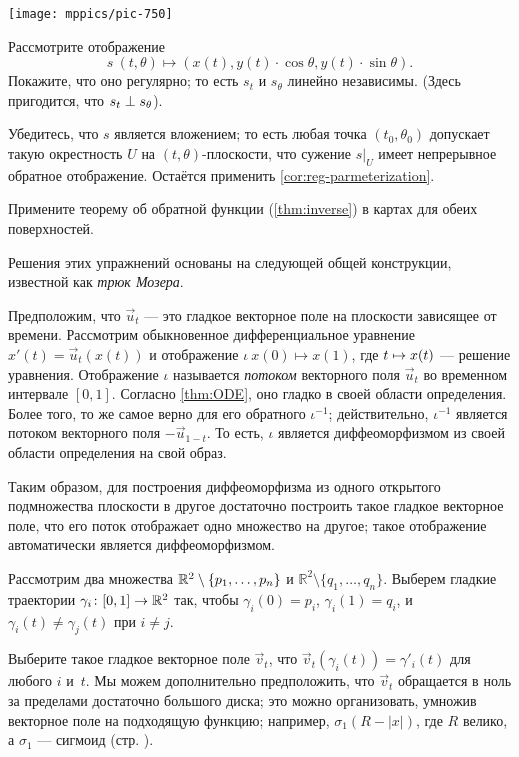 \begin{multicols}{2}
\begin{Figure}
\vskip-0mm
\centering
\texttt{[image: mppics/pic-750]}
\vskip0mm
\end{Figure}

Рассмотрите отображение
\[s\:(t,\theta)\mapsto (x(t), y(t)\cdot\cos\theta,y(t)\cdot\sin\theta).\]
Покажите, что оно регулярно; то есть $s_t$ и $s_\theta$ линейно независимы.
(Здесь пригодится, что $s_t\z\perp s_\theta$).

Убедитесь, что $s$ является вложением;
то есть любая точка $(t_0,\theta_0)$ допускает такую окрестность $U$ на $(t,\theta)$-плоскости, что сужение $s|_U$ имеет непрерывное обратное отображение.
Остаётся применить \ref{cor:reg-parmeterization}.

Примените теорему об обратной функции (\ref{thm:inverse}) в картах для обеих поверхностей.

Решения этих упражнений основаны на следующей общей конструкции, известной как \emph{трюк Мозера}.

Предположим, что $\vec u_t$ --- это гладкое векторное поле на плоскости зависящее от времени.
Рассмотрим обыкновенное дифференциальное уравнение $x'(t)=\vec u_t(x(t))$ и отображение $\iota\:x(0)\mapsto x(1)$, где $t\z\mapsto x(t)$ --- решение уравнения.
Отображение $\iota$ называется \emph{потоком} векторного поля $\vec u_t$ во временном интервале $[0,1]$.
Согласно \ref{thm:ODE}, оно гладко в своей области определения.
Более того, то же самое верно для его обратного $\iota^{-1}$;
действительно, $\iota^{-1}$ является потоком векторного поля $-\vec u_{1-t}$.
То есть, $\iota$ является диффеоморфизмом из своей области определения на свой образ.

Таким образом, для построения диффеоморфизма из одного открытого подмножества плоскости в другое достаточно построить такое гладкое векторное поле, что его поток отображает одно множество на другое;
такое отображение автоматически является диффеоморфизмом.


Рассмотрим два множества $\mathbb{R}^2\z\setminus\{p_1,\dots,p_n\}$ и $\mathbb{R}^2\setminus\{q_1,\dots,q_n\}$.
Выберем гладкие траектории $\gamma_i\:[0,1]\z\to \mathbb{R}^2$ так, чтобы $\gamma_i(0)=p_i$,
$\gamma_i(1)=q_i$, и $\gamma_i(t)\ne \gamma_j(t)$ при $i\ne j$.

Выберите такое гладкое векторное поле $\vec v_t$, что $\vec v_t(\gamma_i(t))=\gamma'_i(t)$ для любого $i$ и~$t$.
Мы можем дополнительно предположить, что $\vec v_t$ обращается в ноль за пределами достаточно большого диска; это можно организовать, умножив векторное поле на подходящую функцию;
например, $\sigma_1(R-|x|)$, где $R$ велико, а $\sigma_1$ --- сигмоид (стр. \pageref{page:sigma-function}).


\end{multicols}
